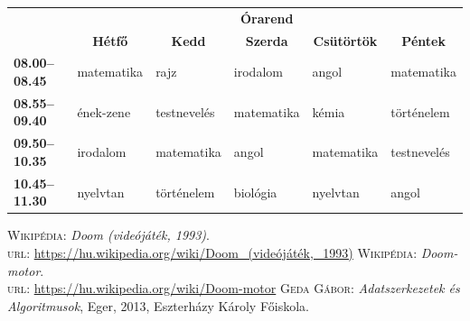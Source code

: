 \documentclass{thesis-ekf}
\theoremstyle{definition}
\theoremstyle{remark}
\begin{document}
\begin{table}[h]
    \centering
    \footnotesize
    \begin{tabular}{|>{\bfseries}l|l|l|l|l|l|}
        \cline{2-6}
        \multicolumn{1}{c|}{} & \multicolumn{5}{c|}{\textbf{Órarend}}\\
        \cline{2-6}
        \multicolumn{1}{c|}{} &
        \multicolumn{1}{c|}{\textbf{Hétfő}} &
        \multicolumn{1}{c|}{\textbf{Kedd}} &
        \multicolumn{1}{c|}{\textbf{Szerda}} &
        \multicolumn{1}{c|}{\textbf{Csütörtök}} &
        \multicolumn{1}{c|}{\textbf{Péntek}} \\
        \hline
        08.00--08.45 &
        matematika &
        rajz &
        irodalom &
        angol &
        matematika\\
        \hline
        08.55--09.40 &
        ének-zene &
        testnevelés &
        matematika &
        kémia &
        történelem\\
        \hline
        09.50--10.35 &
        irodalom &
        matematika &
        angol &
        matematika &
        testnevelés\\
        \hline
        10.45--11.30 &
        nyelvtan &
        történelem &
        biológia &
        nyelvtan &
        angol\\
        \hline
    \end{tabular}
\end{table}

\begin{thebibliography}{2}
     \textsc{Wikipédia}: \emph{Doom (videójáték, 1993)}.\\
    \textsc{url}: \url{https://hu.wikipedia.org/wiki/Doom_(videójáték,_1993)}
     \textsc{Wikipédia}: \emph{Doom-motor}.\\\textsc{url}:
    \url{https://hu.wikipedia.org/wiki/Doom-motor}
     \textsc{Geda Gábor}: \emph{Adatszerkezetek és Algoritmusok},
    Eger, 2013, Eszterházy Károly Főiskola.
\end{thebibliography}


\end{document}
